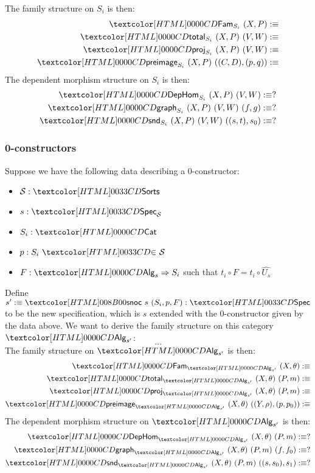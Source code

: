 The family structure on $S_i$ is then:
%
\begin{align*}
  \Fam_{S_i}\ (X , P) &\ddefeq \\
  \total_{S_i}\ (X , P)\ (V , W) &\ddefeq \\
  \proj_{S_i}\ (X, P)\ (V, W) &\ddefeq \\
  \preimage_{S_i}\ (X, P)\ ((C,D),(p, q)) &\ddefeq  
\end{align*}
%
The dependent morphism structure on $S_i$ is then:
%
\begin{align*}
  \DepHom_{S_i}\ (X , P)\ (V , W) &\ddefeq ?\\
  \grph_{S_i}\ (X , P)\ (V , W)\ (f , g) &\ddefeq ? \\
  \snd_{S_i}\ (X , P)\ (V , W)\ ((s , t) , s_0) &\ddefeq ?
\end{align*}
%

\subsubsection{0-constructors}

Suppose we have the following data describing a 0-constructor:
%
\begin{itemize}
\item $\Ss : \sortsty$
\item $s : \specty_{\Ss}$
\item $S_i : \Cat$
\item $p : \sortsin{S_i}{\Ss}$
\item $F : \Func{\Alg_s}{S_i}$ such that $t_i \circ F = t_i \circ \hat{U_s}$
\end{itemize}

Define $s' \ddefeq \specsnoc\ s\ (S_i,p,F) : \specty$ to be the new
specification, which is $s$ extended with the 0-constructor given by
the data above. We want to derive the family structure on this
category $\Alg_{s'}$:
$$
\hdots
$$
The family structure on $\Alg_{s'}$ is then:
%
\begin{align*}
  \Fam_{\Alg_{s'}}\ (X , \theta) &\ddefeq \\
  \total_{\Alg_{s'}}\ (X , \theta)\ (P , m) &\ddefeq \\
  \proj_{\Alg_{s'}}\ (X , \theta)\ (P , m) &\ddefeq \\
  \preimage_{\Alg_{s'}}\ (X,  \theta)\ ((Y , \rho),(p , p_0)) &\ddefeq  
\end{align*}
%
The dependent morphism structure on $\Alg_{s'}$ is then:
%
\begin{align*}
  \DepHom_{\Alg_{s'}}\ (X , \theta)\ (P , m) &\ddefeq ?\\
  \grph_{\Alg_{s'}}\ (X , \theta)\ (P , m)\ (f , f_0) &\ddefeq ? \\
  \snd_{\Alg_{s'}}\ (X , \theta)\ (P , m)\ ((s , s_0) , s_1) &\ddefeq ?
\end{align*}
%

